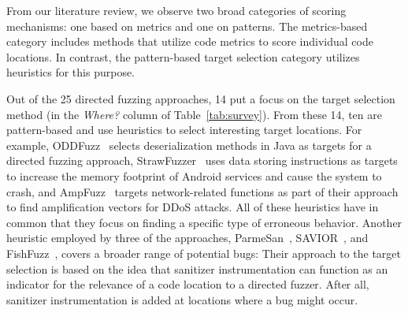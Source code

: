 From our literature review, we observe two broad categories of scoring mechanisms: one based on metrics and one on patterns. The metrics-based category includes methods that utilize code metrics to score individual code locations. In contrast, the pattern-based target selection category utilizes heuristics for this purpose.

\begin{table}[t]
    \centering
    \footnotesize
    \caption{}
		
    \label{tab:survey}
\end{table}

Out of the 25 directed fuzzing approaches, 14 put a focus on the target selection method (\cmark in the \emph{Where?} column of Table~\ref{tab:survey}). From these 14, ten are pattern-based and use heuristics to select interesting target locations. For example, ODDFuzz~\cite{CaoHeSunOuy+23} selects deserialization methods in Java as targets for a directed fuzzing approach, StrawFuzzer~\cite{ZhaLiaXiaZha+22} uses data storing instructions as targets to increase the memory footprint of Android services and cause the system to crash, and AmpFuzz~\cite{KruGriRos22} targets network-related functions as part of their approach to find amplification vectors for DDoS attacks. All of these heuristics have in common that they focus on finding a specific type of erroneous behavior. Another heuristic employed by three of the approaches, ParmeSan~\cite{OstRazBosGiu+20}, SAVIOR~\cite{CheLiXuGuo+20}, and FishFuzz~\cite{ZheZhaHuaRen+23}, covers a broader range of potential bugs: Their approach to the target selection is based on the idea that sanitizer instrumentation can function as an indicator for the relevance of a code location to a directed fuzzer. After all, sanitizer instrumentation is added at locations where a bug might occur.

